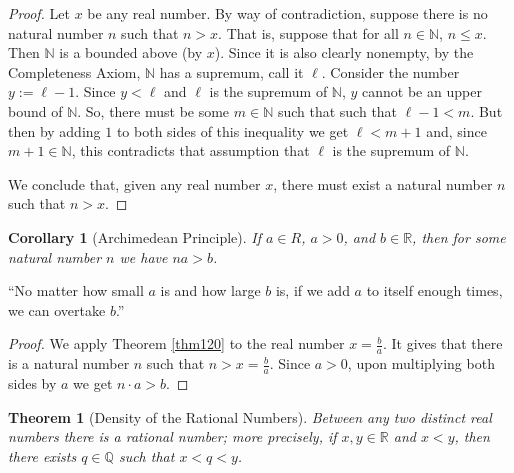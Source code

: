 \documentclass[12pt]{amsart}
\newcommand{\Q}{\mathbb{Q}}
\newcommand{\R}{{\mathbb{R}}}
\newcommand{\N}{\mathbb{N}}
\numberwithin{equation}{section}
\theoremstyle{plain} %
\newtheorem{thm}[equation]{Theorem}
\newtheorem{cor}[equation]{Corollary}
\theoremstyle{definition}
\theoremstyle{remark}
\begin{document}
\begin{proof} Let $x$ be any real number. By way of contradiction, suppose there is no natural number $n$ such that $n > x$. That is, suppose that for all $n \in
  \N$, $n \leq x$. Then $\N$ is a bounded above (by $x$). Since it is also clearly nonempty,  by the Completeness
  Axiom, $\N$ has a supremum, call it $\ell$. Consider the number $y := \ell- 1$. Since $y < \ell$ and $\ell$ is the supremum of $\N$,  
$y$ cannot be an upper bound of $\N$. So, there must be some $m \in \N$
  such that such that $\ell-1 < m$. But then by adding $1$ to both sides of this inequality we get $\ell < m+1$ and, 
since $m + 1 \in \N$, this contradicts that assumption that $\ell$ is the supremum of $\N$. 

We conclude that, given any real number $x$,  there must exist a natural number  $n$ such that $n > x$.
\end{proof}

\begin{cor}[Archimedean Principle] If $a \in R$, $a >0$, and $b \in \R$, then for some natural number $n$ we have $na > b$.
\end{cor}


``No matter how small $a$ is and how large $b$ is, if we add $a$ to itself enough times, we can overtake $b$.''

\begin{proof} We apply Theorem \ref{thm120} to the real number $x = \frac{b}{a}$. It gives that 
  there is a natural number $n$ such that $n > x = \frac{b}{a}$. Since $a > 0$, upon multiplying both sides
  by $a$ we get $n \cdot a  > b$.
\end{proof}

\begin{thm}[Density of the Rational Numbers] 
Between any two distinct  real numbers there is a rational number; more precisely, if $x, y \in \R$ and $x < y$, then there
  exists $q \in \Q$ such that $x < q < y$.
\end{thm}
\end{document}

